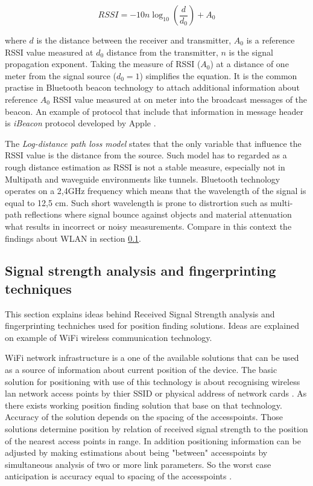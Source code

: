 \documentclass[../main.tex]{subfiles}
\begin{document}
\begin{equation}
\label{eq:log-distance-model}
	RSSI = -10 n \log_{10} (\frac{d}{d_0}) + A_0
\end{equation}

where $ d $ is the distance between the receiver and transmitter, $A_0$ is a reference RSSI value measured at $d_0$ distance from the transmitter, $n$ is the signal propagation exponent. Taking the measure of RSSI ($A_0$) at a distance of one meter from the signal source ($d_0 = 1$) simplifies the equation. It is the common practise in Bluetooth beacon technology to attach additional information about reference $A_0$ RSSI value measured at on meter into the broadcast messages of the beacon. An example of protocol that include that information in message header is \textit{iBeacon} protocol developed by Apple \cite{beacons_ble_evaluation}.

The \textit{Log-distance path loss model} states that the only variable that influence the RSSI value is the distance from the source. Such model has to regarded as a rough distance estimation as RSSI is not a stable measure, especially not in Multipath and waveguide environments like tunnels. Bluetooth technology operates on a 2,4GHz frequency which means that the wavelength of the signal is equal to 12,5 cm. Such short wavelength is prone to distrortion such as multi-path reflections where signal bounce against objects and material attenuation what results in incorrect or noisy measurements\cite{RSSI_path_loss_prediction_model}. Compare in this context the findings about WLAN in section \ref{sub:wifi_fingerprinting}.


\subsection{Signal strength analysis and fingerprinting techniques} %
\label{sub:wifi_fingerprinting}

This section explains ideas behind Received Signal Strength analysis and fingerprinting techniches used for position finding solutions. Ideas are explained on example of WiFi wireless communication technology.

WiFi network infrastructure is a one of the available solutions that can be used as a source of information about current position of the device. The basic solution for positioning with use of this technology is about recognising wireless lan network access points by thier SSID or physical address of network cards \cite{WLAN_fingerprinting}. As there exists working position finding solution that base on that technology. Accuracy of the solution depends on the spacing of the accesspoints. Those solutions determine position by relation of received signal strength to the position of the nearest access points in range. In addition positioning information can be adjusted by making estimations about being "between" accesspoints by simultaneous analysis of two or more link parameters. So the worst case anticipation is accuracy equal to spacing of the accesspoints \cite{Thesis_CM}\cite{thesis_tablet_positioning}.
\end{document}
